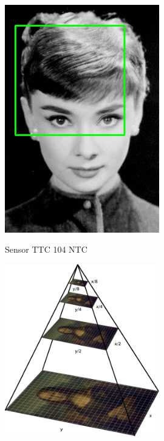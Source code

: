 \begin{itemize}
\begin{itemize}
\begin{figure}[h]
	\centering
	\begin{minipage}[b]{0.49\textwidth}
		\centering
		\includegraphics[width=0.6\textwidth]{img/sliding_window_example-11.png}
		\caption{Sensor TTC 104 NTC}
	\end{minipage}
	\hfill
	\begin{minipage}[b]{0.49\textwidth}
		\centering
		\includegraphics[width=0.6\textwidth]{img/pyramid.png}
		\caption[Piramide ..Retirado de]{ \cite{Rosebrock2015}}
		\label{esquema-temp}
	\end{minipage}
\end{figure}



	

\end{itemize}
	
	 
	
\end{itemize}














